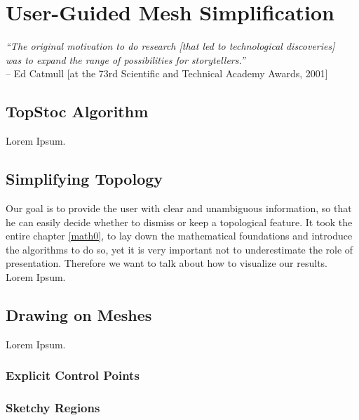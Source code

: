\chapter{User-Guided Mesh Simplification}
\label{topstoc0}

\begin{flushright}
\textit{``The original motivation to do research [that led to technological discoveries]\\was to expand the range of possibilities for storytellers.''}\\
-- Ed Catmull {[}at the 73rd Scientific and Technical Academy Awards, 2001{]}
\end{flushright}


\section{TopStoc Algorithm}
\label{topstoc1}

Lorem Ipsum.


\section{Simplifying Topology}
\label{topstoc2}

Our goal is to provide the user with clear and unambiguous information, so that he can easily decide whether to dismiss or keep a topological feature.
It took the entire chapter \ref{math0}, to lay down the mathematical foundations and introduce the algorithms to do so, yet it is very important not to underestimate the role of presentation.
Therefore we want to talk about how to visualize our results.\\
Lorem Ipsum.


\section{Drawing on Meshes}
\label{topstoc3}

Lorem Ipsum.

\subsection{Explicit Control Points}
\label{topstoc31}

\subsection{Sketchy Regions}
\label{topstoc32}


